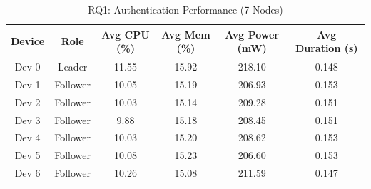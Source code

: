 \begin{table}[htbp]
\centering
\caption{RQ1: Authentication Performance (7 Nodes)}
\label{tab:RQ1-Authentication-7Nodes-table}
\begin{tabular}{|c|c|c|c|c|c|}
\hline
\textbf{Device} & \textbf{Role} & \textbf{Avg CPU (\%)} & \textbf{Avg Mem (\%)} & \textbf{Avg Power (mW)} & \textbf{Avg Duration (s)} \\
\hline
Dev 0 & Leader & 11.55 & 15.92 & 218.10 & 0.148 \\
\hline
Dev 1 & Follower & 10.05 & 15.19 & 206.93 & 0.153 \\
\hline
Dev 2 & Follower & 10.03 & 15.14 & 209.28 & 0.151 \\
\hline
Dev 3 & Follower & 9.88 & 15.18 & 208.45 & 0.151 \\
\hline
Dev 4 & Follower & 10.03 & 15.20 & 208.62 & 0.153 \\
\hline
Dev 5 & Follower & 10.08 & 15.23 & 206.60 & 0.153 \\
\hline
Dev 6 & Follower & 10.26 & 15.08 & 211.59 & 0.147 \\
\hline
\end{tabular}
\end{table}
